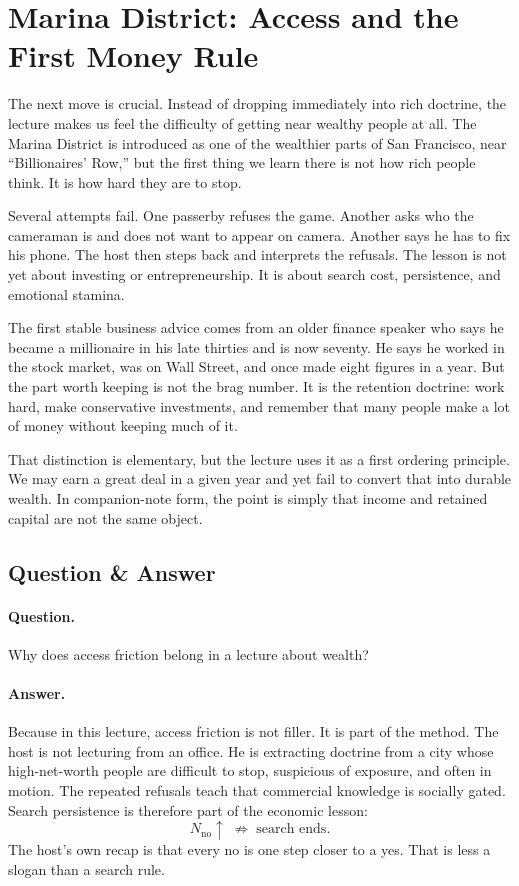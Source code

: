 \section{Marina District: Access and the First Money Rule}

The next move is crucial. Instead of dropping immediately into rich doctrine, the lecture makes us feel the difficulty of getting near wealthy people at all. The Marina District is introduced as one of the wealthier parts of San Francisco, near ``Billionaires' Row,'' but the first thing we learn there is not how rich people think. It is how hard they are to stop.

Several attempts fail. One passerby refuses the game. Another asks who the cameraman is and does not want to appear on camera. Another says he has to fix his phone. The host then steps back and interprets the refusals. The lesson is not yet about investing or entrepreneurship. It is about search cost, persistence, and emotional stamina.

The first stable business advice comes from an older finance speaker who says he became a millionaire in his late thirties and is now seventy. He says he worked in the stock market, was on Wall Street, and once made eight figures in a year. But the part worth keeping is not the brag number. It is the retention doctrine: work hard, make conservative investments, and remember that many people make a lot of money without keeping much of it.

That distinction is elementary, but the lecture uses it as a first ordering principle. We may earn a great deal in a given year and yet fail to convert that into durable wealth. In companion-note form, the point is simply that income and retained capital are not the same object.

\subsection{Question \& Answer}

\paragraph{Question.} Why does access friction belong in a lecture about wealth?

\paragraph{Answer.} Because in this lecture, access friction is not filler. It is part of the method. The host is not lecturing from an office. He is extracting doctrine from a city whose high-net-worth people are difficult to stop, suspicious of exposure, and often in motion. The repeated refusals teach that commercial knowledge is socially gated. Search persistence is therefore part of the economic lesson:
\begin{equation}
N_{\text{no}}\uparrow \;\not\Rightarrow\; \text{search ends}.
\end{equation}
The host's own recap is that every no is one step closer to a yes. That is less a slogan than a search rule.

